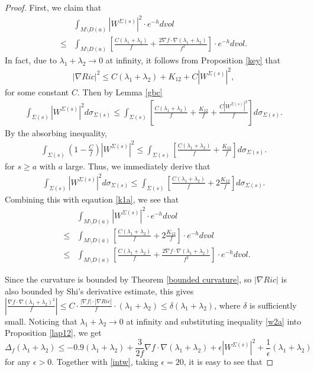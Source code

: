 \documentclass[12pt]{amsart}
\newcommand{\ban}{\begin{eqnarray*}}
\newcommand{\ean}{\end{eqnarray*}}
\begin{document}
\begin{proof}
	First, we claim that
	\begin{equation}\label{intw}
		\begin{aligned}
			&\int_{M\setminus D(a)} |W^{\Sigma(s)}|^2\cdot e^{-h}dvol\\
			\leq& \int_{M\setminus D(a)}\left[\frac{C(\lambda_1+\lambda_2)}{f}+\frac{2\nabla f\cdot\nabla(\lambda_1+\lambda_2)}{f^2}\right]\cdot e^{-h}dvol.
		\end{aligned}
	\end{equation}
	In fact, due to $\lambda_1+\lambda_2\rightarrow 0$ at infinity, it follows from Proposition \ref{key} that
	\ban
	|\nabla Ric|^2\leq C(\lambda_1+\lambda_2)+K_{12}+C|W^{\Sigma(s)}|^2,
	\ean		
	for some constant $C$. Then by Lemma \ref{gbc}
	\ban
	\int_{\Sigma(s)}|W^{\Sigma(s)}|^2d\sigma_{\Sigma(s)}
	\leq \int_{\Sigma(s)}\left[ \frac{C(\lambda_1+\lambda_2)}{f}+\frac{K_{12}}{f}+\frac{C|W^{\Sigma(s)}|^2}{f}\right]d\sigma_{\Sigma(s)}.
	\ean
	By the absorbing inequality,
	\ban
	\int_{\Sigma(s)}(1-\frac{C}{f})|W^{\Sigma(s)}|^2
	\leq \int_{\Sigma(s)} \left[ \frac{C(\lambda_1+\lambda_2)}{f}+\frac{K_{12}}{f}\right] d\sigma_{\Sigma(s)}.
	\ean
	for $s\geq a$ with $a$ large. Thus, we immediately derive that
	\ban
	\int_{\Sigma(s)}|W^{\Sigma(s)}|^2d\sigma_{\Sigma(s)}
	\leq \int_{\Sigma(s)}\left[  \frac{C(\lambda_1+\lambda_2)}{f}+2\frac{K_{12}}{f}\right] d\sigma_{\Sigma(s)}.
	\ean
	Combining this with eqaution \eqref{k1a}, we see that
	\ban
	&&\int_{M\setminus D(a)} |W^{\Sigma(s)}|^2\cdot e^{-h}dvol\\
	&\leq& \int_{M\setminus D(a)}\left[\frac{C(\lambda_1+\lambda_2)}{f}+2\frac{K_{12}}{f}\right]\cdot e^{-h}dvol\\
	&\leq& \int_{M\setminus D(a)}\left[\frac{C(\lambda_1+\lambda_2)}{f}+\frac{2\nabla f\cdot\nabla(\lambda_1+\lambda_2)}{f^2}\right]\cdot e^{-h}dvol.
	\ean
	
	\vspace{0.5cm}
Since the curvature is bounded by Theorem \ref{bounded curvature}, so $|\nabla Ric|$ is also bounded by Shi's derivative estimate, this gives $|\frac{\nabla f\cdot \nabla (\lambda_1+\lambda_2)^2}{f}|\leq C\cdot\frac{|\nabla f|\cdot|\nabla Ric|}{f}\cdot (\lambda_1+\lambda_2)\leq \delta (\lambda_1+\lambda_2)$, where $\delta$ is sufficiently small. 	Noticing that $\lambda_1+\lambda_2\rightarrow 0$ at infinity and substituting inequality \eqref{w2a} into Proposition \ref{lap12}, we get
	\begin{equation*}
		\Delta_f(\lambda_1+\lambda_2)
		\leq-0.9(\lambda_1+\lambda_2)+\frac{3}{2f}\nabla f\cdot \nabla (\lambda_1+\lambda_2)+ \epsilon|W^{\Sigma(s)}|^2+\frac{1}{\epsilon}(\lambda_1+\lambda_2)
	\end{equation*}	
	for any $\epsilon>0$. Together with \eqref{intw}, taking $\epsilon=20$, it is easy to see that
	

\end{proof}
\end{document}
